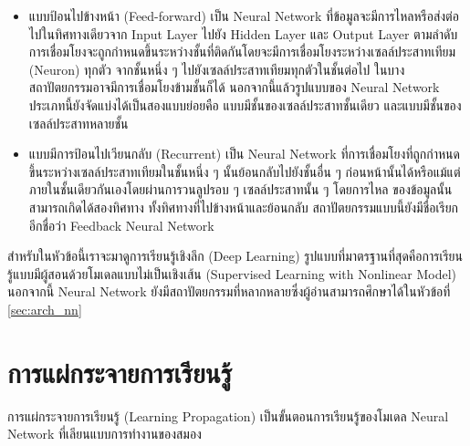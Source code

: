 \begin{itemize}[topsep=0pt,noitemsep]\setlength\itemsep{0.5em}
    \item แบบป้อนไปข้างหน้า (Feed-forward) เป็น Neural Network ที่ข้อมูลจะมีการไหลหรือส่งต่อไปในทิศทางเดียวจาก Input Layer
          ไปยัง Hidden Layer และ Output Layer ตามลำดับ การเชื่อมโยงจะถูกกำหนดขึ้นระหว่างชั้นที่ติดกันโดยจะมีการเชื่อมโยงระหว่างเซลล์ประสาทเทียม (Neuron) ทุกตัว จากชั้นหนึ่ง ๆ ไปยังเซลล์ประสาทเทียมทุกตัวในชั้นต่อไป ในบางสถาปัตยกรรมอาจมีการเชื่อมโยงข้ามชั้นก็ได้
          นอกจากนี้แล้วรูปแบบของ Neural Network ประเภทนี้ยังจัดแบ่งได้เป็นสองแบบย่อยคือ แบบมีชั้นของเซลล์ประสาทชั้นเดียว และแบบมีชั้นของเซลล์ประสาทหลายชั้น

    \item แบบมีการป้อนไปเวียนกลับ (Recurrent) เป็น Neural Network ที่การเชื่อมโยงที่ถูกกำหนดขึ้นระหว่างเซลล์ประสาทเทียมในชั้นหนึ่ง ๆ นั้นย้อนกลับไปยังชั้นอื่น ๆ ก่อนหน้านั้นได้หรือแม้แต่ภายในชั้นเดียวกันเองโดยผ่านการวนลูปรอบ ๆ เซลล์ประสาทนั้น ๆ โดยการไหล          ของข้อมูลนั้นสามารถเกิดได้สองทิศทาง ทั้งทิศทางที่ไปข้างหน้าและย้อนกลับ สถาปัตยกรรมแบบนี้ยังมีชื่อเรียกอีกชื่อว่า Feedback Neural
          Network
\end{itemize}

สำหรับในหัวข้อนี้เราจะมาดูการเรียนรู้เชิงลึก (Deep Learning) รูปแบบที่มาตรฐานที่สุดคือการเรียนรู้แบบมีผู้สอนด้วยโมเดลแบบไม่เป็นเชิงเส้น
(Supervised Learning with Nonlinear Model) นอกจากนี้ Neural Network ยังมีสถาปัตยกรรมที่หลากหลายซึ่งผู้อ่านสามารถศึกษาได้ในหัวข้อที่ \ref{sec:arch_nn}

\section{การแผ่กระจายการเรียนรู้}

การแผ่กระจายการเรียนรู้ (Learning Propagation) เป็นขั้นตอนการเรียนรู้ของโมเดล Neural Network ที่เลียนแบบการทำงานของสมอง

